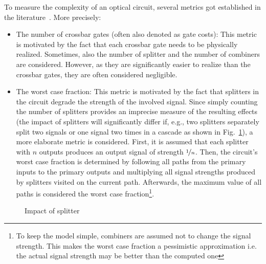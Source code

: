 \documentclass[10pt,letterpaper,twoside,openright]{book}
\begin{document}
To measure the complexity of an optical circuit, several metrics got established in the literature~\cite{Condrat2011,WKHD:2015}. More precisely:
\begin{itemize}
\item The number of crossbar gates (often also denoted as gate costs): This metric is  motivated by the fact that each crossbar gate needs to be physically realized. Sometimes, also the number of splitter and the number of combiners are considered. However, as they are significantly easier to realize than the crossbar gates, they are often considered negligible. 

\item The worst case fraction: This metric is motivated by the fact that splitters in the circuit degrade the strength of the involved signal. Since simply counting the number of splitters provides an imprecise measure of the resulting effects (the impact of splitters will significantly differ if, e.g., two splitters separately split two signals or one signal two times in a cascade as shown in Fig.~\ref{fig:split-effect}), a more elaborate metric is considered. First, it is assumed that each splitter with $n$ outputs produces an output signal of strength $\nicefrac{1}{n}$. Then, the circuit's worst case fraction is determined by following all paths from the primary inputs to the primary outputs and multiplying all signal strengths produced by splitters visited on the current path. Afterwards, the maximum value of all paths is considered the worst case fraction\footnote{To keep the model simple, combiners are assumed not to change the signal strength. This makes the worst case fraction a pessimistic approximation i.e. the actual signal strength may be better than the computed one}.
\end{itemize}

\begin{figure}[!h]
\centering
{}
\caption{Impact of splitter}
\label{fig:split-effect}
\end{figure}
\end{document}
